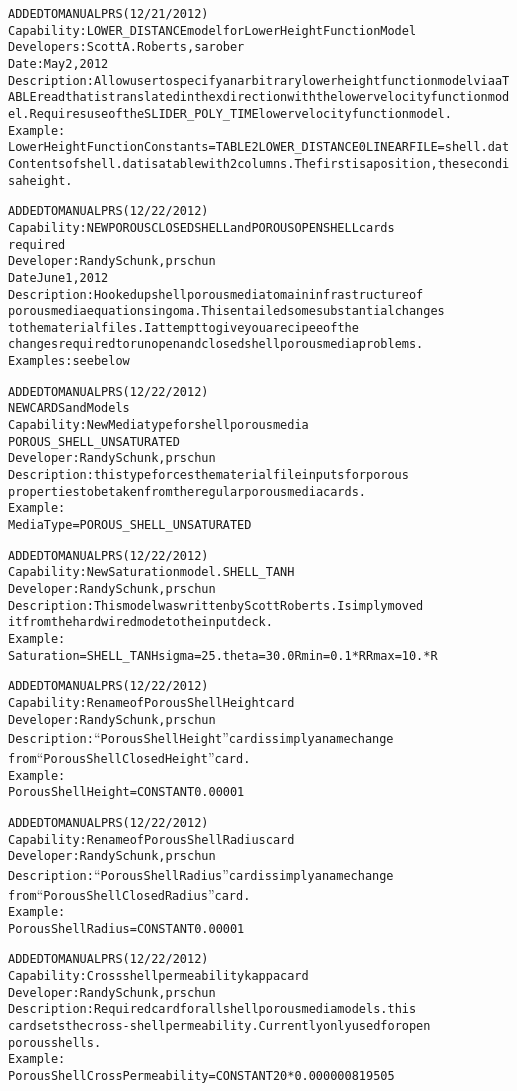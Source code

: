 \documentclass{article}
\begin{document}
\begin{alltt}
ADDED TO MANUAL PRS (12/21/2012)
Capability:  LOWER_DISTANCE model for Lower Height Function Model
Developers:  Scott A. Roberts, sarober
Date:  May 2, 2012
Description:  Allow user to specify an arbitrary lower height function model via a TABLE read that is translated in the x direction with the lower velocity function model.  Requires use of the SLIDER_POLY_TIME lower velocity function model.
Example:
Lower Height Function Constants   = TABLE 2 LOWER_DISTANCE 0 LINEAR FILE=shell.dat
Contents of shell.dat is a table with 2 columns.  The first is a position, the second is a height.

ADDED TO MANUAL PRS (12/22/2012)
Capability:  NEW POROUS CLOSED SHELL and POROUS OPEN SHELL cards
required
Developer: Randy Schunk, prschun
Date June 1, 2012
Description: Hooked up shell porous media to main infrastructure of
porous media equations in goma. This entailed some substantial changes
to the material files.    I attempt to give you a recipee of the
changes required to run open and closed shell porous media problems.
Examples: see below

ADDED TO MANUAL PRS (12/22/2012)
NEW CARDS and Models
Capability: New Media type for shell porous media
POROUS_SHELL_UNSATURATED
Developer: Randy Schunk, prschun
Description: this type forces the material file inputs for porous
properties to be taken from the regular porous media cards. 
Example:
Media Type	 	           = POROUS_SHELL_UNSATURATED

ADDED TO MANUAL PRS (12/22/2012)
Capability: New Saturation model. SHELL_TANH
Developer: Randy Schunk, prschun
Description: This model was written by Scott Roberts. I simply moved
it from the hardwired mode to the input deck.    
Example:
Saturation = SHELL_TANH {sigma=25.} {theta=30.0} {Rmin =0.1*R} {Rmax = 10.*R}

ADDED TO MANUAL PRS (12/22/2012)
Capability:  Rename of Porous Shell Height card
Developer: Randy Schunk, prschun
Description: ``Porous Shell Height'' card is simply a name change
from ``Porous Shell Closed Height'' card.  
Example: 
Porous Shell Height               = CONSTANT 0.00001

ADDED TO MANUAL PRS (12/22/2012)
Capability:  Rename of Porous Shell Radius card
Developer: Randy Schunk, prschun
Description: ``Porous Shell Radius'' card is simply a name change
from ``Porous Shell Closed Radius'' card.  
Example: 
Porous Shell Radius              = CONSTANT 0.00001

ADDED TO MANUAL PRS (12/22/2012)
Capability:  Cross shell permeability kappa card
Developer: Randy Schunk, prschun
Description: Required card for all shell porous media models.  this
card sets the cross-shell permeability. Currently only used for open
porous shells. 
Example: 
Porous Shell Cross Permeability = CONSTANT {20*0.000000819505}


\end{alltt}
\end{document}
